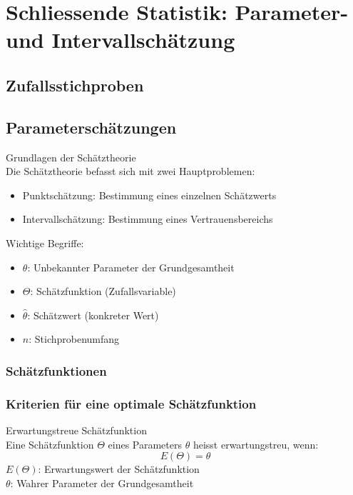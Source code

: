 \section{Schliessende Statistik: Parameter- und Intervallschätzung}

\subsection{Zufallsstichproben}

\subsection{Parameterschätzungen}

\begin{concept}{Grundlagen der Schätztheorie}\\
Die Schätztheorie befasst sich mit zwei Hauptproblemen:
\begin{itemize}
  \item Punktschätzung: Bestimmung eines einzelnen Schätzwerts
  \item Intervallschätzung: Bestimmung eines Vertrauensbereichs
\end{itemize}

Wichtige Begriffe:
\begin{itemize}
  \item $\theta$: Unbekannter Parameter der Grundgesamtheit
  \item $\Theta$: Schätzfunktion (Zufallsvariable)
  \item $\hat{\theta}$: Schätzwert (konkreter Wert)
  \item $n$: Stichprobenumfang
\end{itemize}
\end{concept}

\subsubsection{Schätzfunktionen}

\subsubsection{Kriterien für eine optimale Schätzfunktion}

\begin{definition}{Erwartungstreue Schätzfunktion}\\
Eine Schätzfunktion $\Theta$ eines Parameters $\theta$ heisst erwartungstreu, wenn:
$$
E(\Theta)=\theta
$$
$E(\Theta)$: Erwartungswert der Schätzfunktion\\
$\theta$: Wahrer Parameter der Grundgesamtheit
\end{definition}

